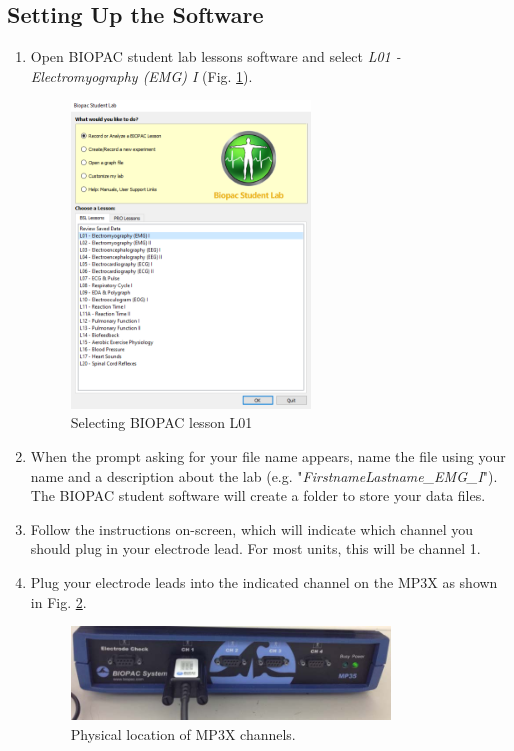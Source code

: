 \documentclass{article}
\begin{document}
\subsection*{Setting Up the Software}
\begin{enumerate}
	\item Open BIOPAC student lab lessons software and select \textit{L01 - Electromyography (EMG) I} (Fig. \ref{lesson}).
		\begin{figure}[h]
	\includegraphics[width=0.6\textwidth]{../images/EMG_I_13.png}
		\centering
		\caption{Selecting BIOPAC lesson L01}
		\label{lesson}
		\end{figure}
		
	\item When the prompt asking for your file name appears, name the file using your name and a description about the lab (e.g. "\textit{FirstnameLastname\_EMG\_I}"). The BIOPAC student software will create a folder to store your data files.
	\item Follow the instructions on-screen, which will indicate which channel you should plug in your electrode lead. For most units, this will be channel 1.	
	\item Plug your electrode leads into the indicated channel on the MP3X as shown in Fig. \ref{channel2}.
		\begin{figure}[h]
	\includegraphics[width=0.8\textwidth]{../images/EMG_I_6.jpg}
		\centering
		\caption{Physical location of MP3X channels.}
		\label{channel2}
		\end{figure}
	

\end{enumerate}
\end{document}
